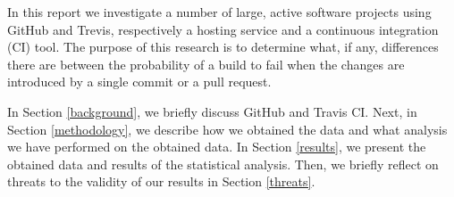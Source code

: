 In this report we investigate a number of large, active software projects using GitHub and Trevis, respectively a hosting service and a continuous integration (CI) tool.
The purpose of this research is to determine what, if any, differences there are between the probability of a build to fail when the changes are introduced by a single commit or a pull request.

In Section \ref{background}, we briefly discuss GitHub and Travis CI.
Next, in Section \ref{methodology}, we describe how we obtained the data and what analysis we have performed on the obtained data.
In Section \ref{results}, we present the obtained data and results of the statistical analysis.
Then, we briefly reflect on threats to the validity of our results in Section \ref{threats}.
